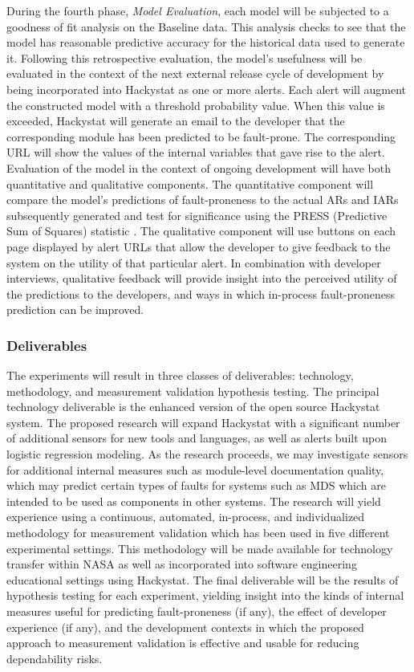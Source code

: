 During the fourth phase, {\em Model Evaluation}, each model will  be
subjected to a goodness of fit analysis on the Baseline data. This analysis
checks to see that the model has reasonable predictive accuracy for the
historical data used to generate it.  Following this retrospective
evaluation, the model's usefulness will be evaluated in the context of the
next external release cycle of development by being incorporated into
Hackystat as one or more alerts.  Each alert will augment the constructed
model with a threshold probability value. When this value is exceeded,
Hackystat will generate an email to the developer that the corresponding
module has been predicted to be fault-prone.  The
corresponding URL will show the values of the internal variables that gave
rise to the alert.  Evaluation of the model in the context of ongoing
development will have both quantitative and qualitative components. The
quantitative component will compare the model's predictions of
fault-proneness to the actual ARs and IARs subsequently generated and test
for significance using the PRESS (Predictive Sum of Squares) statistic
\cite{Szabo95}. The qualitative component will use buttons on each page
displayed by alert URLs that allow the developer to give feedback to the
system on the utility of that particular alert. In combination with
developer interviews, qualitative feedback will provide insight into the
perceived utility of the predictions to the developers, and ways in which 
in-process fault-proneness prediction can be improved. 

\subsubsection{Deliverables}

The experiments will result in three classes of deliverables: technology,
methodology, and measurement validation hypothesis testing.  The principal
technology deliverable is the enhanced version of the open source Hackystat
system.  The proposed research will expand Hackystat with a significant
number of additional sensors for new tools and languages, as well as alerts
built upon logistic regression modeling. As the research proceeds, we may
investigate sensors for additional internal measures such as module-level
documentation quality, which may predict certain types of faults for
systems such as MDS which are intended to be used as components in other
systems.  The research will yield experience using a continuous,
automated, in-process, and individualized methodology for measurement
validation which has been used in five different experimental settings.
This methodology will be made available for technology transfer within NASA
as well as incorporated into software engineering educational settings
using Hackystat.  The final deliverable will be the results of hypothesis
testing for each experiment, yielding insight into the kinds of internal
measures useful for predicting fault-proneness (if any), the
effect of developer experience (if any), and the development contexts in
which the proposed approach to measurement validation is effective and
usable for reducing dependability risks.

